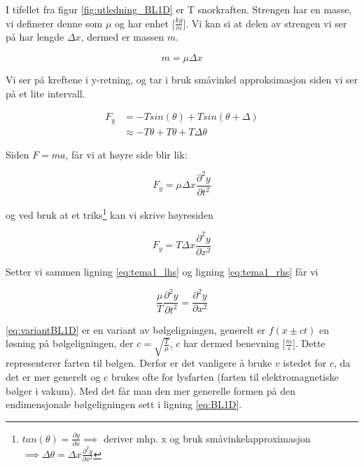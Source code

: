 I tifellet fra figur \ref{fig:utledning_BL1D} er \color{red}T \color{black} snorkraften. Strengen har en masse, vi definerer denne som $\mu$ og har enhet $\bigg[\frac{kg}{m}\bigg]$. Vi kan si at delen av strengen vi ser på har lengde $\Delta x$, dermed er massen $m$.

\begin{equation}
    m = \mu \Delta x
\end{equation}

Vi ser på kreftene i y-retning, og tar i bruk småvinkel approksimasjon siden vi ser på et lite intervall.

\begin{equation}
    \begin{split}
        F_y &= -Tsin(\theta) + Tsin(\theta + \Delta)\\
        &\approx -T\theta + T\theta + T\Delta\theta
    \end{split}
\end{equation}

Siden $F=ma$, får vi at høyre side blir lik:

\begin{equation}
\label{eq:tema1_lhs}
    F_y = \mu \Delta x \frac{\partial^2y}{\partial t^2}
\end{equation}

og ved bruk at et triks\footnote{$tan(\theta)=\frac{\partial y}{\partial x} \implies$ deriver mhp. x og bruk småvinkelapproximasjon $\implies \Delta \theta =\Delta x \frac{\partial^2 y}{\partial x^2}$} kan vi skrive høyresiden

\begin{equation}
\label{eq:tema1_rhs}
    F_y = T \Delta x \frac{\partial^2y}{\partial x^2}
\end{equation}

Setter vi sammen ligning \ref{eq:tema1_lhs} og ligning \ref{eq:tema1_rhs} får vi

\begin{equation}
\label{eq:variantBL1D}
    \frac{\mu}{T} \frac{\partial^2 y}{\partial t^2} = \frac{\partial^2 y}{\partial x^2}
\end{equation}

\autoref{eq:variantBL1D} er en variant av bølgeligningen, generelt er $f(x \pm ct) $ en løsning på bølgeligningen, der $c = \sqrt{\frac{T}{\mu}}$, $c$ har dermed benevning $\big[\frac{m}{s}\big]$. Dette representerer farten til bølgen. Derfor er det vanligere å bruke $v$ istedet for $c$, da det er mer generelt og c brukes ofte for lysfarten (farten til elektromagnetiske bølger i vakum). Med det får man den mer generelle formen på den endimensjonale bølgeligningen sett i ligning \ref{eq:BL1D}.

